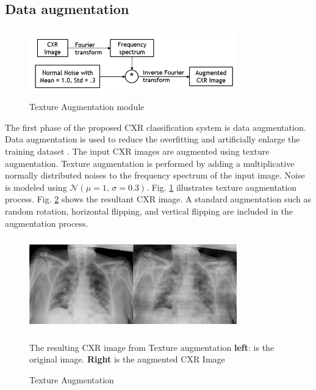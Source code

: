 \subsection{Data augmentation}


\begin{center}
    \begin{figure}[htbp]
    \centerline{\includegraphics[height=30mm,width=9cm]{Figures/TexAug.PNG}}
    \caption{Texture Augmentation module}
    \label{texaug}
    \end{figure}
    \end{center}
The first phase of the proposed CXR classification system is data augmentation. Data augmentation is used to reduce the overfitting and artificially enlarge the training dataset \cite{krizhevsky2012imagenet}. The input CXR images are augmented  using texture augmentation.  Texture augmentation is performed by adding a multiplicative normally distributed noises to the frequency spectrum of the input image. Noise is modeled using $\mathcal{N}(\mu = 1,\,\sigma = 0.3)$. Fig. \ref{texaug} illustrates texture augmentation process. Fig. \ref{resltaug} shows the resultant CXR image. A standard augmentation such as random rotation, horizontal flipping, and vertical flipping are included in the augmentation process. 

\begin{center}
    \begin{figure}[htbp]
    \centerline{\includegraphics[height=40mm,width=9cm]{Figures/freqJitt.png}}
    \caption{Texture Augmentation}{The resulting CXR image from Texture augmentation \textbf{left}: is the original image. \textbf{Right} is the augmented  CXR Image}
    \label{resltaug}
    \end{figure}
    \end{center} 
    

